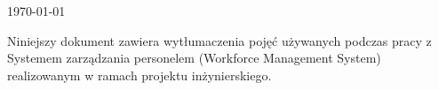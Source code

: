 \begin{titlepage}




    \vfill\vfill\vfill %

    {\large\today} %

    \vfill %

\end{titlepage}

\newpage

Niniejszy dokument zawiera wytłumaczenia pojęć używanych podczas pracy z Systemem zarządzania personelem (Workforce Management System) realizowanym w ramach projektu inżynierskiego.


